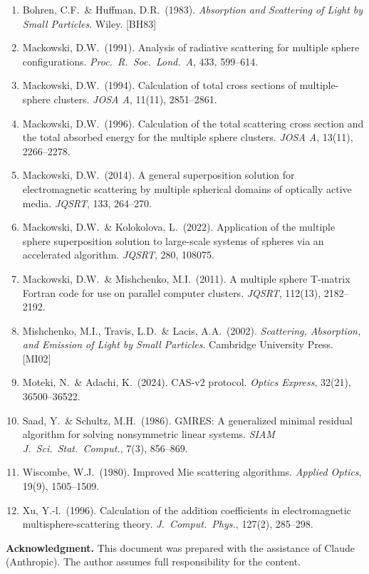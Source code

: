 \documentclass[11pt,a4paper]{article}
\begin{document}
\begin{enumerate}[nosep]
  \item Bohren, C.F.\ \& Huffman, D.R.\ (1983). \textit{Absorption and Scattering of Light by Small Particles}. Wiley. [BH83]
  \item Mackowski, D.W.\ (1991). Analysis of radiative scattering for multiple sphere configurations. \textit{Proc.\ R.\ Soc.\ Lond.\ A}, 433, 599--614.
  \item Mackowski, D.W.\ (1994). Calculation of total cross sections of multiple-sphere clusters. \textit{JOSA A}, 11(11), 2851--2861.
  \item Mackowski, D.W.\ (1996). Calculation of the total scattering cross section and the total absorbed energy for the multiple sphere clusters. \textit{JOSA A}, 13(11), 2266--2278.
  \item Mackowski, D.W.\ (2014). A general superposition solution for electromagnetic scattering by multiple spherical domains of optically active media. \textit{JQSRT}, 133, 264--270.
  \item Mackowski, D.W.\ \& Kolokolova, L.\ (2022). Application of the multiple sphere superposition solution to large-scale systems of spheres via an accelerated algorithm. \textit{JQSRT}, 280, 108075.
  \item Mackowski, D.W.\ \& Mishchenko, M.I.\ (2011). A multiple sphere T-matrix Fortran code for use on parallel computer clusters. \textit{JQSRT}, 112(13), 2182--2192.
  \item Mishchenko, M.I., Travis, L.D.\ \& Lacis, A.A.\ (2002). \textit{Scattering, Absorption, and Emission of Light by Small Particles}. Cambridge University Press. [MI02]
  \item Moteki, N.\ \& Adachi, K.\ (2024). CAS-v2 protocol. \textit{Optics Express}, 32(21), 36500--36522.
  \item Saad, Y.\ \& Schultz, M.H.\ (1986). GMRES: A generalized minimal residual algorithm for solving nonsymmetric linear systems. \textit{SIAM J.\ Sci.\ Stat.\ Comput.}, 7(3), 856--869.
  \item Wiscombe, W.J.\ (1980). Improved Mie scattering algorithms. \textit{Applied Optics}, 19(9), 1505--1509.
  \item Xu, Y.-l.\ (1996). Calculation of the addition coefficients in electromagnetic multisphere-scattering theory. \textit{J.\ Comput.\ Phys.}, 127(2), 285--298.
\end{enumerate}

\bigskip
\noindent\textbf{Acknowledgment.}\quad
This document was prepared with the assistance of Claude (Anthropic). The author assumes full responsibility for the content.
\end{document}
